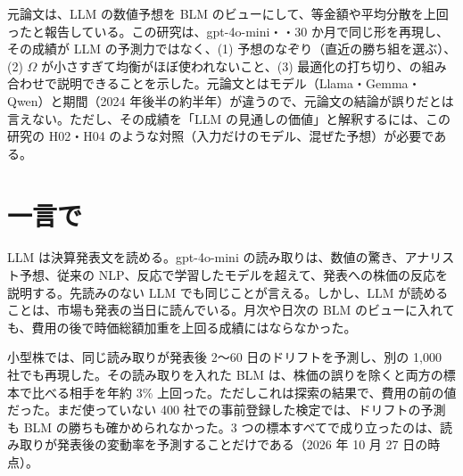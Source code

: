 元論文は、LLM の数値予想を BLM のビューにして、等金額や平均分散を上回ったと報告している。この研究は、gpt-4o-mini・\SP{}・30 か月で同じ形を再現し、その成績が LLM の予測力ではなく、(1) 予想のなぞり（直近の勝ち組を選ぶ）、(2) $\Omega$ が小さすぎて均衡がほぼ使われないこと、(3) 最適化の打ち切り、の組み合わせで説明できることを示した。元論文とはモデル（Llama・Gemma・Qwen）と期間（2024 年後半の約半年）が違うので、元論文の結論が誤りだとは言えない。ただし、その成績を「LLM の見通しの価値」と解釈するには、この研究の H02・H04 のような対照（入力だけのモデル、混ぜた予想）が必要である。

\section{一言で}

\begin{keybox}[結論]
LLM は決算発表文を読める。gpt-4o-mini の読み取りは、数値の驚き、アナリスト予想、従来の NLP、反応で学習したモデルを超えて、発表への株価の反応を説明する。先読みのない LLM でも同じことが言える。しかし、LLM が読めることは、市場も発表の当日に読んでいる。月次や日次の BLM のビューに入れても、費用の後で時価総額加重を上回る成績にはならなかった。

小型株では、同じ読み取りが発表後 2〜60 日のドリフトを予測し、別の 1,000 社でも再現した。その読み取りを入れた BLM は、株価の誤りを除くと両方の標本で比べる相手を年約 3\% 上回った。ただしこれは探索の結果で、費用の前の値だった。まだ使っていない 400 社での事前登録した検定では、ドリフトの予測も BLM の勝ちも確かめられなかった。3 つの標本すべてで成り立ったのは、読み取りが発表後の変動率を予測することだけである（2026 年 10 月 27 日の時点）。
\end{keybox}
